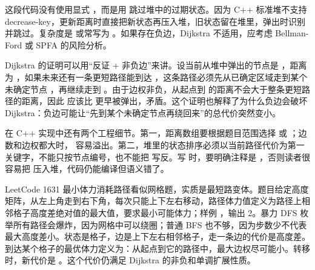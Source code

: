 这段代码没有使用显式 ，而是用  跳过堆中的过期状态。因为 C++ 标准堆不支持 decrease-key，更新距离时直接把新状态再压入堆，旧状态留在堆里，弹出时识别并跳过。复杂度是  或常写为 。如果存在负边，Dijkstra 不适用，应考虑 Bellman-Ford 或 SPFA 的风险分析。

Dijkstra 的证明可以用“反证 + 非负边”来讲。设当前从堆中弹出的节点是 ，距离为 ，如果未来还有一条更短路径能到达 ，这条路径必须先从已确定区域走到某个未确定节点 ，再继续走到 。由于边权非负，从起点到  的距离不会大于整条更短路径的距离，因此  应该比  更早被弹出，矛盾。这个证明也解释了为什么负边会破坏 Dijkstra：负边可能让“先到某个未确定节点再绕回来”的总代价突然变小。

在 C++ 实现中还有两个工程细节。第一，距离数组要根据题目范围选择  或 ；边数和边权都大时， 容易溢出。第二，堆里的状态排序必须以当前路径代价为第一关键字，不能只按节点编号，也不能把  写反。写  时，要明确注释是 ，否则读者很容易把  压入堆，代码仍能编译但语义错了。

LeetCode 1631 最小体力消耗路径看似网格题，实质是最短路变体。题目给定高度矩阵，从左上角走到右下角，每次只能上下左右移动，路径体力值定义为路径上相邻格子高度差绝对值的最大值，要求最小可能体力；样例 ，输出 2。暴力 DFS 枚举所有路径会爆炸，因为网格中可以绕圈；普通 BFS 也不够，因为步数少不代表最大高度差小。状态是格子，边是上下左右相邻格子，走一条边的代价是高度差。到达某个格子的最优体力定义为：从起点到它的路径中，最大边权尽可能小。转移时，新代价是 。这个代价仍满足 Dijkstra 的非负和单调扩展性质。

